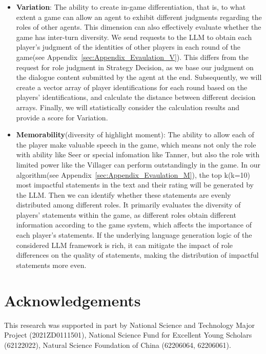 \documentclass[11pt]{article}
\begin{document}
\begin{itemize}
  \item \textbf{Variation}: The ability to create in-game differentiation, that is, to what extent a game can allow an agent to exhibit different judgments regarding the roles of other agents. This dimension can also effectively evaluate whether the game has inter-turn diversity. We send requests to the LLM to obtain each player's judgment of the identities of other players in each round of the game(see Appendix~\ref{sec:Appendix_Evaulation_V}). This differs from the request for role judgment in Strategy Decision, as we base our judgment on the dialogue content submitted by the agent at the end. Subsequently, we will create a vector array of player identifications for each round based on the players' identifications, and calculate the distance between different decision arrays. Finally, we will statistically consider the calculation results and provide a score for Variation.
 
  \item \textbf{Memorability}(diversity of highlight moment): The ability to allow each of the player make valuable speech in the game, which means not only the role with ability like Seer or special infomation like Tanner, but also the role with limited power like the Villager can perform outstandingly in the game. In our algorithm(see Appendix~\ref{sec:Appendix_Evaulation_M}), the top k(k=10) most impactful statements in the text and their rating will be generated by the LLM. Then we can identify whether these statements are evenly distributed among different roles. It primarily evaluates the diversity of players' statements within the game, as different roles obtain different information according to the game system, which affects the importance of each player's statements. If the underlying language generation logic of the considered LLM framework is rich, it can mitigate the impact of role differences on the quality of statements, making the distribution of impactful statements more even.
  
  
\end{itemize}




\section*{Acknowledgements}
This research was supported in part by  National Science and Technology Major Project (2021ZD0111501), National Science Fund for Excellent Young Scholars (62122022), Natural Science Foundation of China (62206064, 62206061). 




\clearpage
\appendix

\label{sec:appendix}


\end{document}
